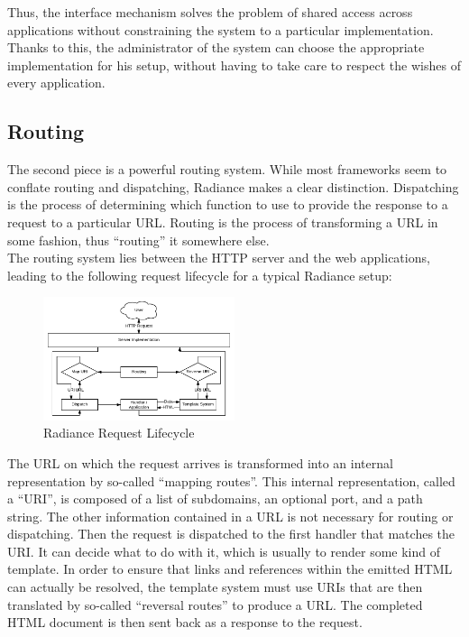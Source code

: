 \documentclass{sig-alternate}
\begin{document}
Thus, the interface mechanism solves the problem of shared access across applications without constraining the system to a particular implementation. Thanks to this, the administrator of the system can choose the appropriate implementation for his setup, without having to take care to respect the wishes of every application. \\

\subsection{Routing}
The second piece is a powerful routing system. While most frameworks seem to conflate routing and dispatching, Radiance makes a clear distinction. Dispatching is the process of determining which function to use to provide the response to a request to a particular URL. Routing is the process of transforming a URL in some fashion, thus ``routing'' it somewhere else. \\

The routing system lies between the HTTP server and the web applications, leading to the following request lifecycle for a typical Radiance setup: \\

\begin{figure}[H]
  \centering
  \includegraphics[width=0.5\textwidth]{request.pdf}
  \caption{Radiance Request Lifecycle}
\end{figure}

The URL on which the request arrives is transformed into an internal representation by so-called ``mapping routes''. This internal representation, called a ``URI'', is composed of a list of subdomains, an optional port, and a path string. The other information contained in a URL is not necessary for routing or dispatching. Then the request is dispatched to the first handler that matches the URI. It can decide what to do with it, which is usually to render some kind of template. In order to ensure that links and references within the emitted HTML can actually be resolved, the template system must use URIs that are then translated by so-called ``reversal routes'' to produce a URL. The completed HTML document is then sent back as a response to the request. \\
\end{document}
